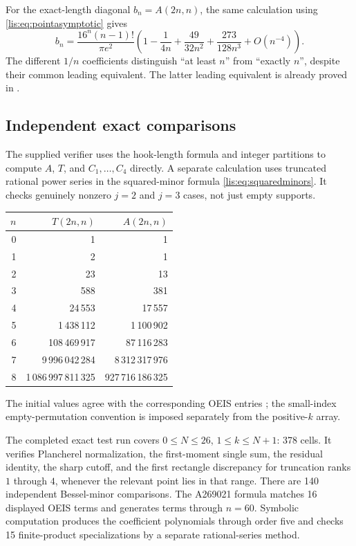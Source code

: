 \documentclass[11pt,letterpaper]{article}
\numberwithin{equation}{section}
\theoremstyle{definition}
\begin{document}
For the exact-length diagonal $b_n=A(2n,n)$, the same calculation using
\eqref{lis:eq:pointasymptotic} gives
\begin{equation}
 b_n=\frac{16^n(n-1)!}{\pi e^2}
       \left(1-\frac1{4n}+\frac{49}{32n^2}
                              +\frac{273}{128n^3}+O(n^{-4})\right).
 \label{lis:eq:267asymptotic}
\end{equation}
The different $1/n$ coefficients distinguish ``at least $n$'' from
``exactly $n$'', despite their common leading equivalent.
The latter leading equivalent is already proved in \cite{Moews}.

\subsection{Independent exact comparisons}
The supplied verifier uses the hook-length formula and integer
partitions to compute $A$, $T$, and $C_1,\ldots,C_4$ directly. A separate
calculation uses truncated rational power series in the squared-minor
formula \eqref{lis:eq:squaredminors}. It checks genuinely nonzero $j=2$
and $j=3$ cases, not just empty supports.

\begin{center}
\begin{tabular}{@{}r r r@{}}
\toprule
$n$ & $T(2n,n)$ & $A(2n,n)$\\
\midrule
0 & 1 & 1\\
1 & 2 & 1\\
2 & 23 & 13\\
3 & 588 & 381\\
4 & 24\,553 & 17\,557\\
5 & 1\,438\,112 & 1\,100\,902\\
6 & 108\,469\,917 & 87\,116\,283\\
7 & 9\,996\,042\,284 & 8\,312\,317\,976\\
8 & 1\,086\,997\,811\,325 & 927\,716\,186\,325\\
\bottomrule
\end{tabular}
\end{center}
The initial values agree with the corresponding OEIS entries
\cite{oeis269,oeis267}; the small-index empty-permutation convention
is imposed separately from the positive-$k$ array.

The completed exact test run covers $0\le N\le26$, $1\le k\le N+1$:
378 cells. It verifies Plancherel normalization, the first-moment
single sum, the residual identity, the sharp cutoff, and the first
rectangle discrepancy for truncation ranks $1$ through $4$, whenever
the relevant point lies in that range. There are 140 independent
Bessel-minor comparisons. The A269021 formula matches 16 displayed
OEIS terms and generates terms through $n=60$. Symbolic computation
produces the coefficient polynomials through order five and checks
15 finite-product specializations by a separate rational-series method.
\end{document}
